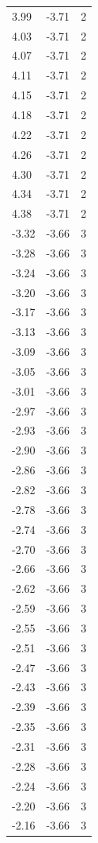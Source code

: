 \begin{longtable}{lrr}
  3.99 & -3.71 & 2 \\
  4.03 & -3.71 & 2 \\
  4.07 & -3.71 & 2 \\
  4.11 & -3.71 & 2 \\
  4.15 & -3.71 & 2 \\
  4.18 & -3.71 & 2 \\
  4.22 & -3.71 & 2 \\
  4.26 & -3.71 & 2 \\
  4.30 & -3.71 & 2 \\
  4.34 & -3.71 & 2 \\
  4.38 & -3.71 & 2 \\
  -3.32 & -3.66 & 3 \\
  -3.28 & -3.66 & 3 \\
  -3.24 & -3.66 & 3 \\
  -3.20 & -3.66 & 3 \\
  -3.17 & -3.66 & 3 \\
  -3.13 & -3.66 & 3 \\
  -3.09 & -3.66 & 3 \\
  -3.05 & -3.66 & 3 \\
  -3.01 & -3.66 & 3 \\
  -2.97 & -3.66 & 3 \\
  -2.93 & -3.66 & 3 \\
  -2.90 & -3.66 & 3 \\
  -2.86 & -3.66 & 3 \\
  -2.82 & -3.66 & 3 \\
  -2.78 & -3.66 & 3 \\
  -2.74 & -3.66 & 3 \\
  -2.70 & -3.66 & 3 \\
  -2.66 & -3.66 & 3 \\
  -2.62 & -3.66 & 3 \\
  -2.59 & -3.66 & 3 \\
  -2.55 & -3.66 & 3 \\
  -2.51 & -3.66 & 3 \\
  -2.47 & -3.66 & 3 \\
  -2.43 & -3.66 & 3 \\
  -2.39 & -3.66 & 3 \\
  -2.35 & -3.66 & 3 \\
  -2.31 & -3.66 & 3 \\
  -2.28 & -3.66 & 3 \\
  -2.24 & -3.66 & 3 \\
  -2.20 & -3.66 & 3 \\
  -2.16 & -3.66 & 3 \\

\end{longtable}
